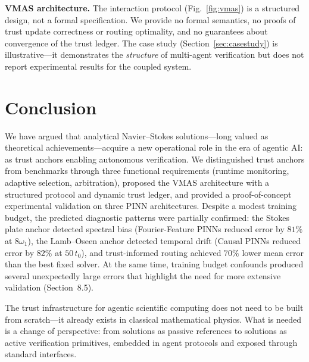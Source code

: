\documentclass[conference]{IEEEtran}
\begin{document}
\textbf{VMAS architecture.} The interaction protocol (Fig.~\ref{fig:vmas}) is a structured design, not a formal specification. We provide no formal semantics, no proofs of trust update correctness or routing optimality, and no guarantees about convergence of the trust ledger. The case study (Section~\ref{sec:casestudy}) is illustrative---it demonstrates the \emph{structure} of multi-agent verification but does not report experimental results for the coupled system.


\section{Conclusion}

We have argued that analytical Navier--Stokes solutions---long valued as theoretical achievements---acquire a new operational role in the era of agentic AI: as trust anchors enabling autonomous verification. We distinguished trust anchors from benchmarks through three functional requirements (runtime monitoring, adaptive selection, arbitration), proposed the VMAS architecture with a structured protocol and dynamic trust ledger, and provided a proof-of-concept experimental validation on three PINN architectures. Despite a modest training budget, the predicted diagnostic patterns were partially confirmed: the Stokes plate anchor detected spectral bias (Fourier-Feature PINNs reduced error by $81\%$ at $8\omega_1$), the Lamb--Oseen anchor detected temporal drift (Causal PINNs reduced error by $82\%$ at $50\,t_0$), and trust-informed routing achieved $70\%$ lower mean error than the best fixed solver. At the same time, training budget confounds produced several unexpectedly large errors that highlight the need for more extensive validation (Section~8.5).

The trust infrastructure for agentic scientific computing does not need to be built from scratch---it already exists in classical mathematical physics. What is needed is a change of perspective: from solutions as passive references to solutions as active verification primitives, embedded in agent protocols and exposed through standard interfaces.
\end{document}
